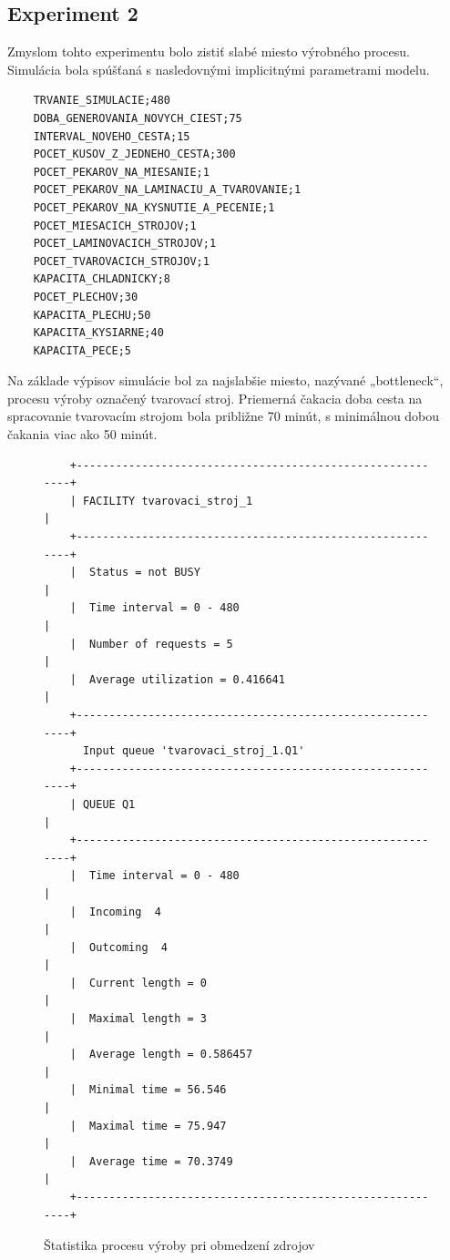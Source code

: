 \documentclass[11pt]{article}
\begin{document}
\newpage
\subsection{Experiment 2}
\label{exp:production_bottleneck_experiment}
Zmyslom tohto experimentu bolo zistiť slabé miesto výrobného procesu. Simulácia bola spúšťaná s nasledovnými implicitnými parametrami modelu.

\begin{verbatim}
    TRVANIE_SIMULACIE;480
    DOBA_GENEROVANIA_NOVYCH_CIEST;75
    INTERVAL_NOVEHO_CESTA;15
    POCET_KUSOV_Z_JEDNEHO_CESTA;300
    POCET_PEKAROV_NA_MIESANIE;1
    POCET_PEKAROV_NA_LAMINACIU_A_TVAROVANIE;1
    POCET_PEKAROV_NA_KYSNUTIE_A_PECENIE;1
    POCET_MIESACICH_STROJOV;1
    POCET_LAMINOVACICH_STROJOV;1
    POCET_TVAROVACICH_STROJOV;1
    KAPACITA_CHLADNICKY;8
    POCET_PLECHOV;30
    KAPACITA_PLECHU;50
    KAPACITA_KYSIARNE;40
    KAPACITA_PECE;5
\end{verbatim}

Na základe výpisov simulácie bol za najslabšie miesto, nazývané „bottleneck“, procesu výroby označený tvarovací stroj. Priemerná čakacia doba cesta na spracovanie tvarovacím strojom bola približne 70 minút, s minimálnou dobou čakania viac ako 50 minút.

\begin{figure}[H]
\begin{verbatim}
    +----------------------------------------------------------+
    | FACILITY tvarovaci_stroj_1                               |
    +----------------------------------------------------------+
    |  Status = not BUSY                                       |
    |  Time interval = 0 - 480                                 |
    |  Number of requests = 5                                  |
    |  Average utilization = 0.416641                          |
    +----------------------------------------------------------+
      Input queue 'tvarovaci_stroj_1.Q1'
    +----------------------------------------------------------+
    | QUEUE Q1                                                 |
    +----------------------------------------------------------+
    |  Time interval = 0 - 480                                 |
    |  Incoming  4                                             |
    |  Outcoming  4                                            |
    |  Current length = 0                                      |
    |  Maximal length = 3                                      |
    |  Average length = 0.586457                               |
    |  Minimal time = 56.546                                   |
    |  Maximal time = 75.947                                   |
    |  Average time = 70.3749                                  |
    +----------------------------------------------------------+
\end{verbatim}
\caption{Štatistika procesu výroby pri obmedzení zdrojov}
\label{fig:resources_limatation_experiment}
\end{figure}
\end{document}
